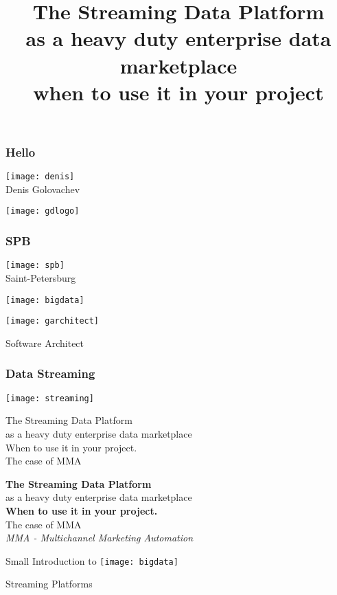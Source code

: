 \documentclass[aspectratio=169, 15pt,usenames,dvipsnames]{beamer}
\title{The Streaming Data Platform\\\small as a heavy duty enterprise data marketplace\\\tiny when to use it in your project}
\begin{document}
  
\begin{titlePage} 
	\titlepage        
\end{titlePage}
	
\begin{gdsw}
	\frametitle{Hello}
	\centering\texttt{[image: denis]}
	\\Denis Golovachev		
\end{gdsw} 
\begin{gdsw}
	\centering\texttt{[image: gdlogo]}
\end{gdsw}
\begin{gdsw}
	\frametitle{SPB}
	\centering\texttt{[image: spb]}
	\\Saint-Petersburg
\end{gdsw}
\begin{gdsw}
	\centering\texttt{[image: bigdata]} 
\end{gdsw}
\begin{gdsw}
	\centering\texttt{[image: garchitect]} 
	\par\LARGE
	Software Architect
\end{gdsw}
\begin{gdsw}
	\frametitle{Data Streaming}
	\centering\texttt{[image: streaming]} 
\end{gdsw}
\begin{gdsw}
	\centering\LARGE
	The Streaming Data Platform\\
	as a heavy duty enterprise data marketplace\\
	When to use it in your project.\\
	The case of MMA
\end{gdsw}
\begin{gdsw}
	\centering\LARGE
	{\bf The Streaming Data Platform}\\
	as a heavy duty enterprise data marketplace\\
	{\bf When to use it in your project.}\\
	The case of MMA
	\pause\\
	{\it\small MMA - Multichannel Marketing Automation}
\end{gdsw}
\begin{gdsw}
	\LARGE\centering Small Introduction to
	\centering\texttt{[image: bigdata]}
	\par
	Streaming Platforms
\end{gdsw}
\end{document}
